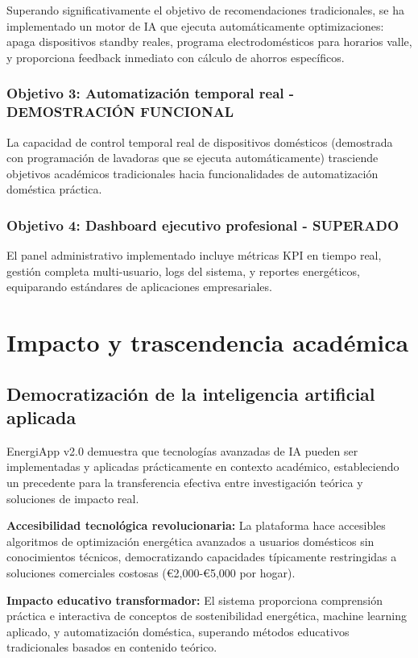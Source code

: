 Superando significativamente el objetivo de recomendaciones tradicionales, se ha implementado un motor de IA que ejecuta automáticamente optimizaciones: apaga dispositivos standby reales, programa electrodomésticos para horarios valle, y proporciona feedback inmediato con cálculo de ahorros específicos.

\subsubsection{Objetivo 3: Automatización temporal real - DEMOSTRACIÓN FUNCIONAL}

La capacidad de control temporal real de dispositivos domésticos (demostrada con programación de lavadoras que se ejecuta automáticamente) trasciende objetivos académicos tradicionales hacia funcionalidades de automatización doméstica práctica.

\subsubsection{Objetivo 4: Dashboard ejecutivo profesional - SUPERADO}

El panel administrativo implementado incluye métricas KPI en tiempo real, gestión completa multi-usuario, logs del sistema, y reportes energéticos, equiparando estándares de aplicaciones empresariales.

\section{Impacto y trascendencia académica}

\subsection{Democratización de la inteligencia artificial aplicada}

EnergiApp v2.0 demuestra que tecnologías avanzadas de IA pueden ser implementadas y aplicadas prácticamente en contexto académico, estableciendo un precedente para la transferencia efectiva entre investigación teórica y soluciones de impacto real.

\textbf{Accesibilidad tecnológica revolucionaria:} La plataforma hace accesibles algoritmos de optimización energética avanzados a usuarios domésticos sin conocimientos técnicos, democratizando capacidades típicamente restringidas a soluciones comerciales costosas (€2,000-€5,000 por hogar).

\textbf{Impacto educativo transformador:} El sistema proporciona comprensión práctica e interactiva de conceptos de sostenibilidad energética, machine learning aplicado, y automatización doméstica, superando métodos educativos tradicionales basados en contenido teórico.

